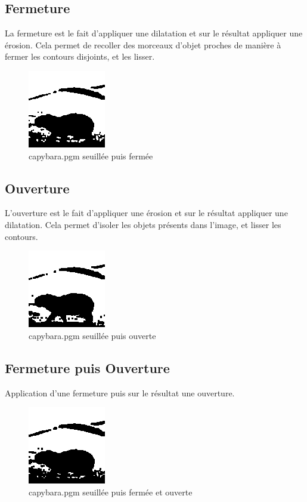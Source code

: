 \documentclass{article}
\begin{document}
\subsection{Fermeture}
La fermeture est le fait d'appliquer une dilatation et sur le résultat appliquer une érosion.
Cela permet de recoller des morceaux d'objet proches de manière à fermer les contours disjoints, et les lisser.

\begin{figure}[h]
\centerline{\includegraphics[scale=1.4]{./rendus/capybatapferm.png}}
\caption{capybara.pgm seuillée puis fermée}
\end{figure}


\subsection{Ouverture}
L'ouverture est le fait d'appliquer une érosion et sur le résultat appliquer une dilatation.
Cela permet d'isoler les objets présents dans l'image, et lisser les contours.

\begin{figure}[h]
\centerline{\includegraphics[scale=1.4]{./rendus/capybatapouv.png}}
\caption{capybara.pgm seuillée puis ouverte}
\end{figure}

\newpage
\subsection{Fermeture puis Ouverture}
Application d'une fermeture puis sur le résultat une ouverture.
\begin{figure}[h]
\centerline{\includegraphics[scale=1.4]{./rendus/capybatapfermouv.png}}
\caption{capybara.pgm seuillée puis fermée et ouverte}
\end{figure}
\end{document}
